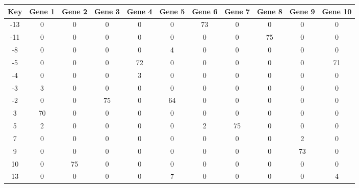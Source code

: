 \begin{tabular}{|c|c|c|c|c|c|c|c|c|c|c|}
\hline
Key & Gene 1 & Gene 2 & Gene 3 & Gene 4 & Gene 5 & Gene 6 & Gene 7 & Gene 8 & Gene 9 & Gene 10 \\
\hline
-13 & 0 & 0 & 0 & 0 & 0 & 73 & 0 & 0 & 0 & 0 \\
-11 & 0 & 0 & 0 & 0 & 0 & 0 & 0 & 75 & 0 & 0 \\
-8 & 0 & 0 & 0 & 0 & 4 & 0 & 0 & 0 & 0 & 0 \\
-5 & 0 & 0 & 0 & 72 & 0 & 0 & 0 & 0 & 0 & 71 \\
-4 & 0 & 0 & 0 & 3 & 0 & 0 & 0 & 0 & 0 & 0 \\
-3 & 3 & 0 & 0 & 0 & 0 & 0 & 0 & 0 & 0 & 0 \\
-2 & 0 & 0 & 75 & 0 & 64 & 0 & 0 & 0 & 0 & 0 \\
3 & 70 & 0 & 0 & 0 & 0 & 0 & 0 & 0 & 0 & 0 \\
5 & 2 & 0 & 0 & 0 & 0 & 2 & 75 & 0 & 0 & 0 \\
7 & 0 & 0 & 0 & 0 & 0 & 0 & 0 & 0 & 2 & 0 \\
9 & 0 & 0 & 0 & 0 & 0 & 0 & 0 & 0 & 73 & 0 \\
10 & 0 & 75 & 0 & 0 & 0 & 0 & 0 & 0 & 0 & 0 \\
13 & 0 & 0 & 0 & 0 & 7 & 0 & 0 & 0 & 0 & 4 \\
\hline
\end{tabular}